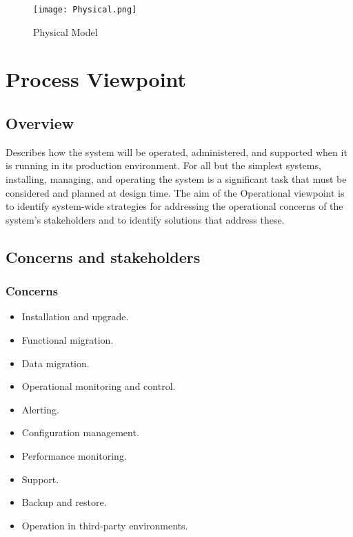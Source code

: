 \FloatBarrier

\begin{figure}[h!]
\centering
\caption{Physical Model}
\texttt{[image: Physical.png]}
\label{Basic Micro-services architecture pattern}
\end{figure}

\FloatBarrier

\section{Process Viewpoint}

\subsection{Overview}

Describes how the system will be operated, administered, and supported when it is running in its production environment. For all but the simplest systems, installing, managing, and operating the system is a significant task that must be considered and planned at design time. The aim of the Operational viewpoint is to identify system-wide strategies for addressing the operational concerns of the system’s stakeholders and to identify solutions that address these.

\subsection{Concerns and stakeholders}

\subsubsection{Concerns}

\begin{itemize}
\item Installation and upgrade.
\item Functional migration. 
\item Data migration.
\item Operational monitoring and control.
\item Alerting.
\item Configuration management.
\item Performance monitoring.
\item Support.
\item Backup and restore.
\item Operation in third-party environments.
\end{itemize}


